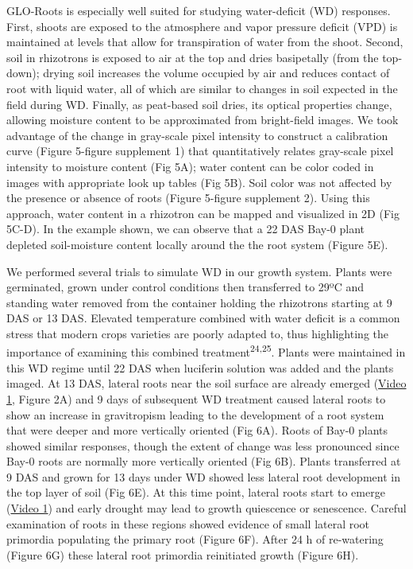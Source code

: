 \documentclass[]{article}
\begin{document}
GLO-Roots is especially well suited for studying water-deficit (WD)
responses. First, shoots are exposed to the atmosphere and vapor
pressure deficit (VPD) is maintained at levels that allow for
transpiration of water from the shoot. Second, soil in rhizotrons is
exposed to air at the top and dries basipetally (from the top-down);
drying soil increases the volume occupied by air and reduces contact of
root with liquid water, all of which are similar to changes in soil
expected in the field during WD. Finally, as peat-based soil dries, its
optical properties change, allowing moisture content to be approximated
from bright-field images. We took advantage of the change in gray-scale
pixel intensity to construct a calibration curve (Figure 5-figure
supplement 1) that quantitatively relates gray-scale pixel intensity to
moisture content (Fig 5A); water content can be color coded in images
with appropriate look up tables (Fig 5B). Soil color was not affected by
the presence or absence of roots (Figure 5-figure supplement 2). Using
this approach, water content in a rhizotron can be mapped and visualized
in 2D (Fig 5C-D). In the example shown, we can observe that a 22 DAS
Bay-0 plant depleted soil-moisture content locally around the the root
system (Figure 5E).

We performed several trials to simulate WD in our growth system. Plants
were germinated, grown under control conditions then transferred to 29ºC
and standing water removed from the container holding the rhizotrons
starting at 9 DAS or 13 DAS. Elevated temperature combined with water
deficit is a common stress that modern crops varieties are poorly
adapted to, thus highlighting the importance of examining this combined
treatment\textsuperscript{24,25}. Plants were maintained in this WD
regime until 22 DAS when luciferin solution was added and the plants
imaged. At 13 DAS, lateral roots near the soil surface are already
emerged
(\href{https://www.dropbox.com/s/sxjc04o0yj2faif/Video_1.avi?dl=0}{Video
1}, Figure 2A) and 9 days of subsequent WD treatment caused lateral
roots to show an increase in gravitropism leading to the development of
a root system that were deeper and more vertically oriented (Fig 6A).
Roots of Bay-0 plants showed similar responses, though the extent of
change was less pronounced since Bay-0 roots are normally more
vertically oriented (Fig 6B). Plants transferred at 9 DAS and grown for
13 days under WD showed less lateral root development in the top layer
of soil (Fig 6E). At this time point, lateral roots start to emerge
(\href{https://www.dropbox.com/s/sxjc04o0yj2faif/Video_1.avi?dl=0}{Video
1}) and early drought may lead to growth quiescence or senescence.
Careful examination of roots in these regions showed evidence of small
lateral root primordia populating the primary root (Figure 6F). After 24
h of re-watering (Figure 6G) these lateral root primordia reinitiated
growth (Figure 6H).
\end{document}
